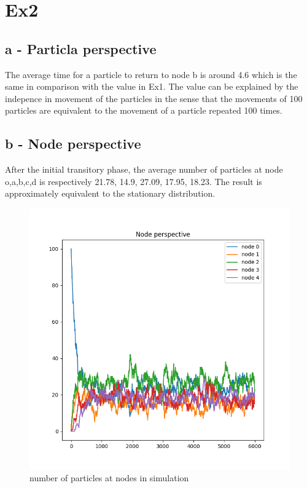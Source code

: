 \documentclass{article}
\begin{document}
\section{Ex2}
\subsection{a - Particla perspective}
The average time for a particle to return to node b is around 4.6 which is the same 
in comparison with the value in Ex1. The value can be explained by the indepence in movement of the particles in the sense that
the movements of 100 particles are equivalent to the movement of a particle repeated 100 times.
\subsection{b - Node perspective}
After the initial transitory phase, the average number of particles at node o,a,b,c,d is respectively 21.78, 14.9, 27.09, 17.95, 18.23.
The result is approximately equivalent to the stationary distribution.

\begin{figure}[!htbp]
    \centering
    \includegraphics[width=\linewidth]{fig/node_perspective}   
    \caption{number of particles at nodes in simulation}
    \label{fig:figure4}
\end{figure}
\end{document}
